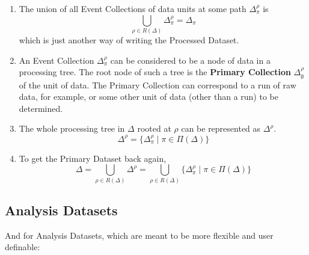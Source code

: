 \documentclass{cmspaper}
\begin{document}
\begin{enumerate}
\item The union
of all Event Collections of data units at some path $\Delta_{\pi}^{\rho}$ is 
\begin{equation}
\bigcup_{\rho \in R(\Delta)} \Delta_{\pi}^{\rho} = \Delta_{\pi}
\end{equation}
which is just another way of writing the Processed Dataset.  

\item An Event Collection $\Delta_{\pi}^{\rho}$ can 
be considered to be a node of data in a processing tree.  
The root node of such a tree is the {\bf Primary Collection} $\Delta_{\emptyset}^{\rho}$ 
of the unit of data.  The Primary Collection can correspond to a 
run of raw data, for example, or some other unit of data 
(other than a run) to be determined.  

\item The whole processing tree in $\Delta$ rooted 
at $\rho$ can be represented as $\Delta^{\rho}$. 
\begin{equation}
\Delta^{\rho} = \{ \Delta_{\pi}^{\rho} \mid \pi \in \Pi(\Delta) \}
\end{equation}

\item To get the Primary Dataset back again, 
\begin{equation}
\Delta = \bigcup_{\rho \in R(\Delta)} \Delta^{\rho} = \bigcup_{\rho \in R(\Delta)} \{ \Delta_{\pi}^{\rho} \mid \pi \in \Pi(\Delta) \} 
\end{equation}

\end{enumerate}


\subsection{Analysis Datasets}

And for Analysis Datasets, which are meant to be more flexible and user definable: 
\end{document}
